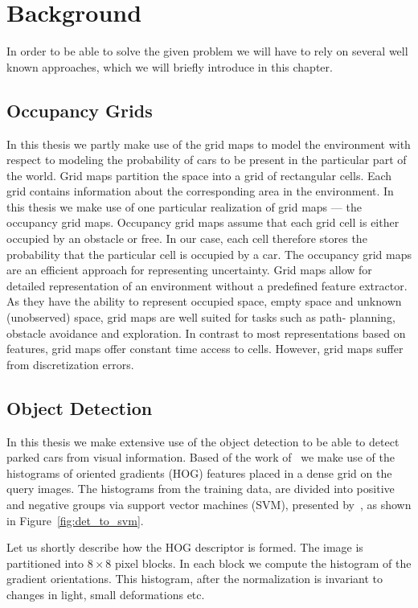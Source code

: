 \chapter{Background}\label{cha:background}
In order to be able to solve the given problem we will have to rely on several
well known approaches, which we will briefly introduce in this chapter.
\section{Occupancy Grids}\label{sec:occupancy_grids}

In this thesis we partly make use of the grid maps to model the
environment with respect to modeling the probability of cars to be
present in the particular part of the world. Grid maps partition the
space into a grid of rectangular cells. Each grid contains information
about the corresponding area in the environment. In this thesis we
make use of one particular realization of grid maps --- the occupancy
grid maps. Occupancy grid maps assume that each grid cell is either
occupied by an obstacle or free. In our case, each cell therefore
stores the probability that the particular cell is occupied by a car.
The occupancy grid maps are an efficient approach for representing
uncertainty. Grid maps allow for detailed representation of an
environment without a predefined feature extractor. As they have the
ability to represent occupied space, empty space and unknown
 (unobserved) space, grid maps are well suited for tasks such as path-
planning, obstacle avoidance and exploration. In contrast to most
representations based on features, grid maps offer constant time
access to cells. However, grid maps suffer from discretization errors.

\section{Object Detection}\label{sec:object_detection}

In this thesis we make extensive use of
the object detection to be able to detect parked cars from visual information.
Based of the work of~\cite{dalal2005} we make use of the histograms of
oriented gradients (HOG) features placed in a dense grid on the query images.
The histograms from the training data, are  divided into positive and negative
groups via support vector machines (SVM), presented by~\cite{svm2003}, as
shown in Figure~\ref{fig:det_to_svm}.

Let us shortly describe how the HOG descriptor is formed. The image is
partitioned into $8 \times 8$ pixel blocks. In each block we compute the
histogram of the gradient orientations. This histogram, after the
normalization is invariant to changes in light, small deformations etc.

